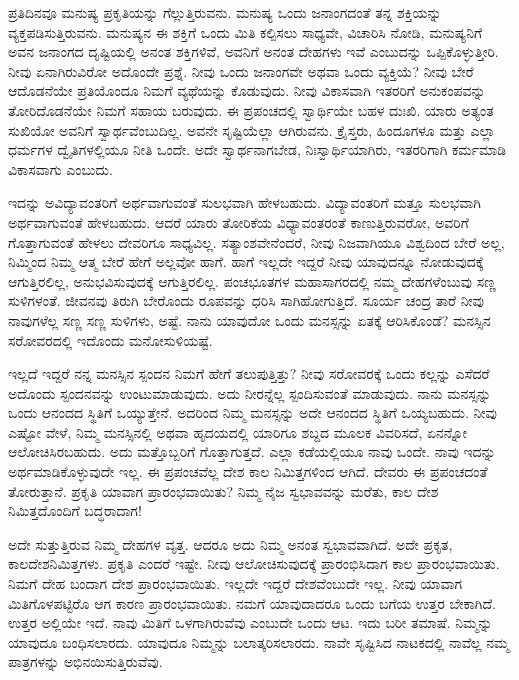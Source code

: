 ಪ್ರತಿದಿನವೂ ಮನುಷ್ಯ ಪ್ರಕೃತಿಯನ್ನು ಗೆಲ್ಲುತ್ತಿರುವನು. ಮನುಷ್ಯ ಒಂದು ಜನಾಂಗದಂತೆ ತನ್ನ ಶಕ್ತಿಯನ್ನು ವ್ಯಕ್ತಪಡಿಸುತ್ತಿರುವನು. ಮನುಷ್ಯನ ಈ ಶಕ್ತಿಗೆ ಒಂದು ಮಿತಿ ಕಲ್ಪಿಸಲು ಸಾಧ್ಯವೇ, ವಿಚಾರಿಸಿ ನೋಡಿ, ಮನುಷ್ಯನಿಗೆ ಅವನ ಜನಾಂಗದ ದೃಷ್ಟಿಯಲ್ಲಿ ಅನಂತ ಶಕ್ತಿಗಳಿವೆ, ಅವನಿಗೆ ಅನಂತ ದೇಹಗಳು ಇವೆ ಎಂಬುದನ್ನು ಒಪ್ಪಿಕೊಳ್ಳುತ್ತೀರಿ. ನೀವು ಏನಾಗಿರುವಿರೋ ಅದೊಂದೇ ಪ್ರಶ್ನೆ. ನೀವು ಒಂದು ಜನಾಂಗವೇ ಅಥವಾ ಒಂದು ವ್ಯಕ್ತಿಯೆ? ನೀವು ಬೇರೆ ಆದೊಡನೆಯೇ ಪ್ರತಿಯೊಂದೂ ನಿಮಗೆ ವ್ಯಥೆಯನ್ನು ಕೊಡುವುದು. ನೀವು ವಿಕಾಸವಾಗಿ ಇತರರಿಗೆ ಅನುಕಂಪವನ್ನು ತೋರಿದೊಡನೆಯೇ ನಿಮಗೆ ಸಹಾಯ ಬರುವುದು. ಈ ಪ್ರಪಂಚದಲ್ಲಿ ಸ್ವಾರ್ಥಿಯೇ ಬಹಳ ದುಃಖಿ. ಯಾರು ಅತ್ಯಂತ ಸುಖಿಯೋ ಅವನಿಗೆ ಸ್ವಾರ್ಥವೆಂಬುದಿಲ್ಲ. ಅವನೇ ಸೃಷ್ಟಿಯೆಲ್ಲಾ ಆಗಿರುವನು. ಕ್ರೈಸ್ತರು, ಹಿಂದೂಗಳೂ ಮತ್ತು ಎಲ್ಲಾ ಧರ್ಮಗಳ ದ್ವೈತಿಗಳಲ್ಲಿಯೂ ನೀತಿ ಒಂದೇ. ಅದೇ ಸ್ವಾರ್ಥನಾಗಬೇಡ, ನಿಃಸ್ವಾರ್ಥಿಯಾಗಿರು, ಇತರರಿಗಾಗಿ ಕರ್ಮಮಾಡಿ ವಿಕಾಸವಾಗು ಎಂಬುದು.

ಇದನ್ನು ಅವಿದ್ಯಾವಂತರಿಗೆ ಅರ್ಥವಾಗುವಂತೆ ಸುಲಭವಾಗಿ ಹೇಳಬಹುದು. ವಿದ್ಯಾವಂತರಿಗೆ ಮತ್ತೂ ಸುಲಭವಾಗಿ ಅರ್ಥವಾಗುವಂತೆ ಹೇಳಬಹುದು. ಆದರೆ ಯಾರು ತೋರಿಕೆಯ ವಿಧ್ಯಾವಂತರಂತೆ ಕಾಣುತ್ತಿರುವರೋ, ಅವರಿಗೆ ಗೊತ್ತಾಗುವಂತೆ ಹೇಳಲು ದೇವರಿಗೂ ಸಾಧ್ಯವಿಲ್ಲ. ಸತ್ಯಾಂಶವೇನೆಂದರೆ, ನೀವು ನಿಜವಾಗಿಯೂ ವಿಶ್ವದಿಂದ ಬೇರೆ ಅಲ್ಲ, ನಿಮ್ಮಿಂದ ನಿಮ್ಮ ಆತ್ಮ ಬೇರೆ ಹೇಗೆ ಅಲ್ಲವೋ ಹಾಗೆ. ಹಾಗೆ ಇಲ್ಲದೇ ಇದ್ದರೆ ನೀವು ಯಾವುದನ್ನೂ ನೋಡುವುದಕ್ಕೆ ಆಗುತ್ತಿರಲಿಲ್ಲ, ಅನುಭವಿಸುವುದಕ್ಕೆ ಆಗುತ್ತಿರಲಿಲ್ಲ. ಪಂಚಭೂತಗಳ ಮಹಾಸಾಗರದಲ್ಲಿ ನಮ್ಮ ದೇಹಗಳೆಂಬುವು ಸಣ್ಣ ಸುಳಿಗಳಂತೆ. ಜೀವನವು ತಿರುಗಿ ಬೇರೊಂದು ರೂಪವನ್ನು ಧರಿಸಿ ಸಾಗಿಹೋಗುತ್ತಿದೆ. ಸೂರ್ಯ ಚಂದ್ರ ತಾರೆ ನೀವು ನಾವುಗಳೆಲ್ಲ ಸಣ್ಣ ಸಣ್ಣ ಸುಳಿಗಳು, ಅಷ್ಟೆ. ನಾನು ಯಾವುದೋ ಒಂದು ಮನಸ್ಸನ್ನು ಏತಕ್ಕೆ ಆರಿಸಿಕೊಂಡೆ? ಮನಸ್ಸಿನ ಸರೋವರದಲ್ಲಿ ಇದೊಂದು ಮನೋಸುಳಿಯಷ್ಟೆ.

ಇಲ್ಲದೆ ಇದ್ದರೆ ನನ್ನ ಮನಸ್ಸಿನ ಸ್ಪಂದನ ನಿಮಗೆ ಹೇಗೆ ತಲುಪುತ್ತಿತ್ತು? ನೀವು ಸರೋವರಕ್ಕೆ ಒಂದು ಕಲ್ಲನ್ನು ಎಸೆದರೆ ಅದೊಂದು ಸ್ಪಂದನವನ್ನು ಉಂಟುಮಾಡುವುದು. ಅದು ನೀರನ್ನೆಲ್ಲ ಸ್ಪಂದಿಸುವಂತೆ ಮಾಡುವುದು. ನಾನು ಮನಸ್ಸನ್ನು ಒಂದು ಆನಂದದ ಸ್ಥಿತಿಗೆ ಒಯ್ಯುತ್ತೇನೆ. ಅದರಿಂದ ನಿಮ್ಮ ಮನಸ್ಸನ್ನು ಅದೇ ಆನಂದದ ಸ್ಥಿತಿಗೆ ಒಯ್ಯಬಹುದು. ನೀವು ಎಷ್ಟೋ ವೇಳೆ, ನಿಮ್ಮ ಮನಸ್ಸಿನಲ್ಲಿ ಅಥವಾ ಹೃದಯದಲ್ಲಿ ಯಾರಿಗೂ ಶಬ್ದದ ಮೂಲಕ ವಿವರಿಸದೆ, ಏನನ್ನೋ ಆಲೋಚಿಸಿರಬಹುದು. ಅದು ಮತ್ತೊಬ್ಬರಿಗೆ ಗೊತ್ತಾಗುತ್ತದೆ. ಎಲ್ಲಾ ಕಡೆಯಲ್ಲಿಯೂ ನಾವು ಒಂದೇ. ನಾವು ಇದನ್ನು ಅರ್ಥಮಾಡಿಕೊಳ್ಳುವುದೇ ಇಲ್ಲ. ಈ ಪ್ರಪಂಚವೆಲ್ಲ ದೇಶ ಕಾಲ ನಿಮಿತ್ತಗಳಿಂದ ಆಗಿದೆ. ದೇವರು ಈ ಪ್ರಪಂಚದಂತೆ ತೋರುತ್ತಾನೆ. ಪ್ರಕೃತಿ ಯಾವಾಗ ಪ್ರಾರಂಭವಾಯಿತು? ನಿಮ್ಮ ನೈಜ ಸ್ವಭಾವವನ್ನು ಮರೆತು, ಕಾಲ ದೇಶ ನಿಮಿತ್ತದೊಂದಿಗೆ ಬದ್ಧರಾದಾಗ!

ಅದೇ ಸುತ್ತುತ್ತಿರುವ ನಿಮ್ಮ ದೇಹಗಳ ವೃತ್ತ. ಆದರೂ ಅದು ನಿಮ್ಮ ಅನಂತ ಸ್ವಭಾವವಾಗಿದೆ. ಅದೇ ಪ್ರಕೃತ, ಕಾಲದೇಶನಿಮಿತ್ತಗಳು. ಪ್ರಕೃತಿ ಎಂದರೆ ಇಷ್ಟೇ. ನೀವು ಆಲೋಚಿಸುವುದಕ್ಕೆ ಪ್ರಾರಂಭಿಸಿದಾಗ ಕಾಲ ಪ್ರಾರಂಭವಾಯಿತು. ನಿಮಗೆ ದೇಹ ಬಂದಾಗ ದೇಶ ಪ್ರಾರಂಭವಾಯಿತು. ಇಲ್ಲದೇ ಇದ್ದರೆ ದೇಶವೆಂಬುದೇ ಇಲ್ಲ. ನೀವು ಯಾವಾಗ ಮಿತಿಗೊಳಪಟ್ಟಿರೊ ಆಗ ಕಾರಣ ಪ್ರಾರಂಭವಾಯಿತು. ನಮಗೆ ಯಾವುದಾದರೂ ಒಂದು ಬಗೆಯ ಉತ್ತರ ಬೇಕಾಗಿದೆ. ಉತ್ತರ ಅಲ್ಲಿಯೇ ಇದೆ. ನಾವು ಮಿತಿಗೆ ಒಳಗಾಗಿರುವೆವು ಎಂಬುದೇ ಒಂದು ಆಟ. ಇದು ಬರೀ ತಮಾಷೆ. ನಿಮ್ಮನ್ನು ಯಾವುದೂ ಬಂಧಿಸಲಾರದು. ಯಾವುದೂ ನಿಮ್ಮನ್ನು ಬಲಾತ್ಕರಿಸಲಾರದು. ನಾವೇ ಸೃಷ್ಟಿಸಿದ ನಾಟಕದಲ್ಲಿ ನಾವೆಲ್ಲ ನಮ್ಮ ಪಾತ್ರಗಳನ್ನು ಅಭಿನಯಿಸುತ್ತಿರುವೆವು.

